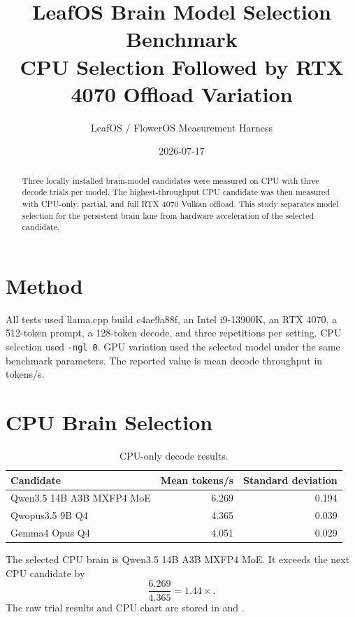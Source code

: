 \documentclass[11pt]{article}
\title{LeafOS Brain Model Selection Benchmark\\\large CPU Selection Followed by RTX 4070 Offload Variation}
\author{LeafOS / FlowerOS Measurement Harness}
\date{2026-07-17}
\begin{document}
\maketitle
\begin{abstract}
Three locally installed brain-model candidates were measured on CPU with three decode trials per model. The highest-throughput CPU candidate was then measured with CPU-only, partial, and full RTX 4070 Vulkan offload. This study separates model selection for the persistent brain lane from hardware acceleration of the selected candidate.
\end{abstract}
\section{Method}
All tests used llama.cpp build c4ae9a88f, an Intel i9-13900K, an RTX 4070, a 512-token prompt, a 128-token decode, and three repetitions per setting. CPU selection used \texttt{-ngl 0}. GPU variation used the selected model under the same benchmark parameters. The reported value is mean decode throughput in tokens/s.
\section{CPU Brain Selection}
\begin{table}[h]
\centering
\caption{CPU-only decode results.}
\begin{tabular}{lrr}
\toprule
Candidate & Mean tokens/s & Standard deviation \\
\midrule
Qwen3.5 14B A3B MXFP4 MoE & 6.269 & 0.194 \\
Qwopus3.5 9B Q4 & 4.365 & 0.039 \\
Gemma4 Opus Q4 & 4.051 & 0.029 \\
\bottomrule
\end{tabular}
\end{table}
The selected CPU brain is Qwen3.5 14B A3B MXFP4 MoE. It exceeds the next CPU candidate by
\[
\frac{6.269}{4.365}=1.44\times.
\]
The raw trial results and CPU chart are stored in  and .
\end{document}
